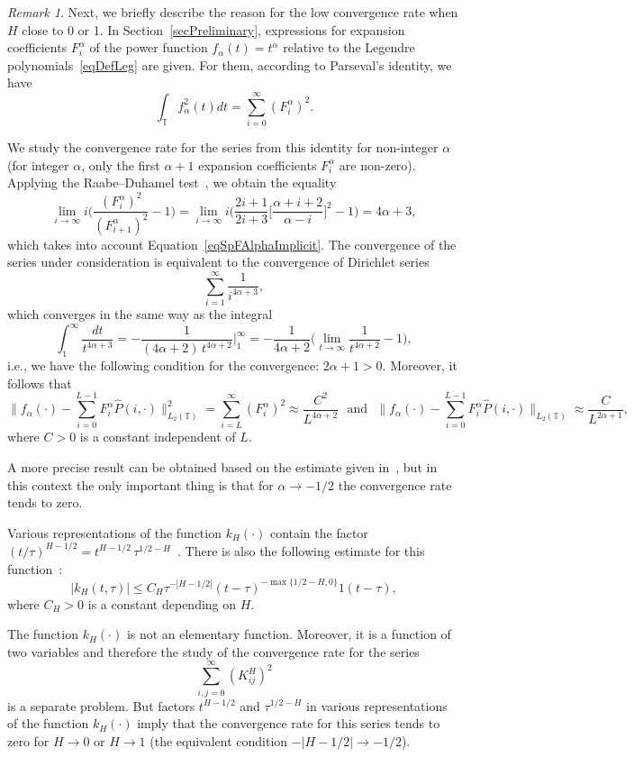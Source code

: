 \documentclass[10pt,reqno]{amsart}
\theoremstyle{plain}
\theoremstyle{remark}
\newtheorem{remark}{Remark}
\newcommand{\LPT}{{L_2(\mathds{T})}}
\begin{document}
\begin{remark}
Next, we briefly describe the reason for the low convergence rate when $H$ close to 0 or 1. In Section~\ref{secPreliminary}, expressions for expansion coefficients $F_i^\alpha$ of the power function $f_\alpha(t) = t^\alpha$ relative to the Legendre polynomials~\eqref{eqDefLeg} are given. For them, according to Parseval's identity, we have
\[
  \int_\mathds{T} f_\alpha^2(t) dt = \sum\limits_{i=0}^\infty (F_i^\alpha)^2.
\]

We study the convergence rate for the series from this identity for non-integer $\alpha$ (for integer $\alpha$, only the first $\alpha+1$ expansion coefficients $F_i^\alpha$ are non-zero). Applying the Raabe--Duhamel test~\cite{PolMan_07}, we obtain the equality
\[
  \lim\limits_{i \to \infty} i \biggl( \frac{(F_i^\alpha)^2}{(F_{i+1}^\alpha)^2} - 1 \biggr) = \lim\limits_{i \to \infty} i \biggl( \frac{2i+1}{2i+3} \biggl[ \frac{\alpha+i+2}{\alpha-i} \biggr]^2 - 1 \biggr) = 4\alpha+3,
\]
which takes into account Equation~\eqref{eqSpFAlphaImplicit}. The convergence of the series under consideration is equivalent to the convergence of Dirichlet series
\[
  \sum\limits_{i=1}^\infty \frac{1}{i^{4\alpha+3}},
\]
which converges in the same way as the integral
\[
  \int_1^\infty \frac{dt}{t^{4\alpha+3}} = -\frac{1}{(4\alpha+2) \, t^{4\alpha+2}} \bigg|_1^\infty = -\frac{1}{4\alpha+2} \biggl( \lim\limits_{t \to \infty} \frac{1}{t^{4\alpha+2}} - 1 \biggr),
\]
i.e., we have the following condition for the convergence: $2\alpha+1 > 0$. Moreover, it follows that
\[
  \biggl\| f_\alpha(\cdot) - \sum\limits_{i=0}^{L-1} F_i^\alpha \hat P(i,\cdot) \biggl\|_\LPT^2 = \sum\limits_{i=L}^\infty (F_i^\alpha)^2 \approx \frac{C^2}{L^{4\alpha+2}}
  \ \ \ \text{and} \ \ \
  \biggl\| f_\alpha(\cdot) - \sum\limits_{i=0}^{L-1} F_i^\alpha \hat P(i,\cdot) \biggl\|_\LPT \approx \frac{C}{L^{2\alpha+1}},
\]
where $C > 0$ is a constant independent of $L$.

A more precise result can be obtained based on the estimate given in~\cite{HouSchwabSuli_JNA02, CanHusQuaZan_06}, but in this context the only important thing is that for $\alpha \to -1/2$ the convergence rate tends to zero.

Various representations of the function $k_H(\cdot)$ contain the factor $(t/\tau)^{H-1/2} = t^{H-1/2} \, \tau^{1/2-H}$~\cite{BiaHuOksZha_08}. There is also the following estimate for this function~\cite{DecUst_PA99}:
\[
  |k_H(t,\tau)| \leqslant C_H \tau^{-|H-1/2|} (t-\tau)^{-\max\{1/2-H,0\}} 1(t-\tau),
\]
where $C_H > 0$ is a constant depending on $H$.

The function $k_H(\cdot)$ is not an elementary function. Moreover, it is a function of two variables and therefore the study of the convergence rate for the series
\[
  \sum\limits_{i,j=0}^\infty (K_{ij}^H)^2
\]
is a separate problem. But factors $t^{H-1/2}$ and $\tau^{1/2-H}$ in various representations of the function $k_H(\cdot)$ imply that the convergence rate for this series tends to zero for $H \to 0$ or $H \to 1$ (the equivalent condition $-|H-1/2| \to -1/2$).
\end{remark}
\end{document}
